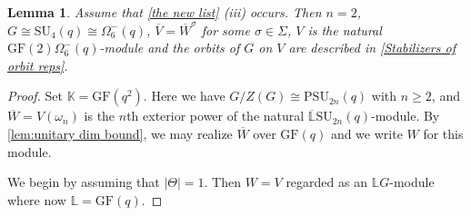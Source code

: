 \documentclass[12pt]{amsart}
\newtheorem{lemma}[theorem]{Lemma}
\theoremstyle{remark}
\theoremstyle{notation}
\theoremstyle{definition}
\newcommand{\SU}{\mathrm{SU}}
\newcommand{\GF}{\mathrm{GF}}
\newcommand{\PSU}{\mathrm{PSU}}
\newcommand{\0}{\emptyset}
\begin{document}
\begin{lemma}\label{unitary gone} Assume that
 \cref{the new list} (iii) occurs. Then $n=2$, $G \cong \SU_4(q)\cong \Omega_6^-(q)$,  $\overline V=\overline W^{\sigma}$ for some $\sigma \in \Sigma$, $V$ is the natural $\GF(2)\Omega_6^-(q)$-module and the orbits of $G$ on $V$ are described in  \cref{Stabilizers of orbit reps}.
\end{lemma}

\begin{proof} Set $\mathbb K = \GF(q^2)$.  Here we have $G/Z(G)\cong \PSU_{2n}(q)$ with $n \ge 2$,  and $\overline W= V(\omega_n)$ is the  $n$th  exterior power of the natural $\overline{\mathbb L}\SU_{2n}(q)$-module. By \cref{lem:unitary dim bound}, we may realize $\overline W$ over $\GF(q  )$  and we write $W$ for this module.

  We begin   by assuming that $|\Theta|=1$.
Then $W= V$ regarded as an $\mathbb LG$-module where now $\mathbb L=\GF(q)$.



\end{proof}
\end{document}
